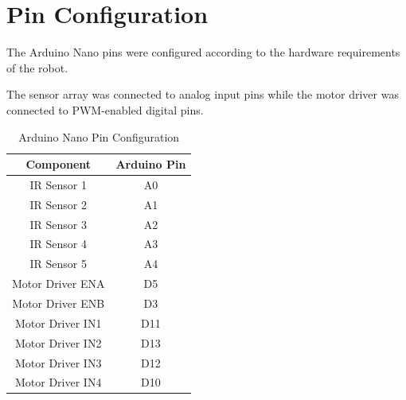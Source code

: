 \documentclass[12pt,a4paper,oneside]{report}
\begin{document}
\section{Pin Configuration}

The Arduino Nano pins were configured according to the hardware requirements of the robot.

The sensor array was connected to analog input pins while the motor driver was connected to PWM-enabled digital pins.


\begin{table}[H]
\centering
\caption{Arduino Nano Pin Configuration}

\begin{tabular}{|c|c|}
\hline

\textbf{Component} &
\textbf{Arduino Pin} \\

\hline

IR Sensor 1 & A0 \\

IR Sensor 2 & A1 \\

IR Sensor 3 & A2 \\

IR Sensor 4 & A3 \\

IR Sensor 5 & A4 \\

Motor Driver ENA & D5 \\

Motor Driver ENB & D3 \\

Motor Driver IN1 & D11 \\

Motor Driver IN2 & D13 \\

Motor Driver IN3 & D12 \\

Motor Driver IN4 & D10 \\

\hline

\end{tabular}

\end{table}

\end{document}
